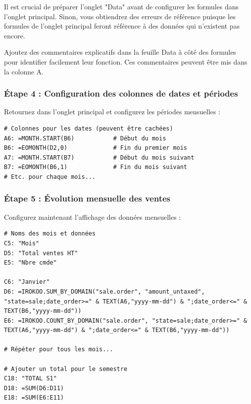 \documentclass[12pt, a4paper]{article}
\begin{document}
\begin{warning}
Il est crucial de préparer l'onglet "Data" avant de configurer les formules dans l'onglet principal. Sinon, vous obtiendrez des erreurs de référence puisque les formules de l'onglet principal feront référence à des données qui n'existent pas encore.
\end{warning}

\begin{tip}
Ajoutez des commentaires explicatifs dans la feuille Data à côté des formules pour identifier facilement leur fonction. Ces commentaires peuvent être mis dans la colonne A.
\end{tip}

\subsubsection{Étape 4 : Configuration des colonnes de dates et périodes}

Retournez dans l'onglet principal et configurez les périodes mensuelles :

\begin{lstlisting}
# Colonnes pour les dates (peuvent être cachées)
A6: =MONTH.START(B6)           # Début du mois
B6: =EOMONTH(D2,0)             # Fin du premier mois
A7: =MONTH.START(B7)           # Début du mois suivant
B7: =EOMONTH(B6,1)             # Fin du mois suivant
# Etc. pour chaque mois...
\end{lstlisting}

\subsubsection{Étape 5 : Évolution mensuelle des ventes}

Configurez maintenant l'affichage des données mensuelles :

\begin{lstlisting}
# Noms des mois et données
C5: "Mois"
D5: "Total ventes HT"
E5: "Nbre cmde"

C6: "Janvier"
D6: =IROKOO.SUM_BY_DOMAIN("sale.order", "amount_untaxed", "state=sale;date_order>=" & TEXT(A6,"yyyy-mm-dd") & ";date_order<=" & TEXT(B6,"yyyy-mm-dd"))
E6: =IROKOO.COUNT_BY_DOMAIN("sale.order", "state=sale;date_order>=" & TEXT(A6,"yyyy-mm-dd") & ";date_order<=" & TEXT(B6,"yyyy-mm-dd"))

# Répéter pour tous les mois...

# Ajouter un total pour le semestre
C18: "TOTAL S1"
D18: =SUM(D6:D11)
E18: =SUM(E6:E11)
\end{lstlisting}
\end{document}

